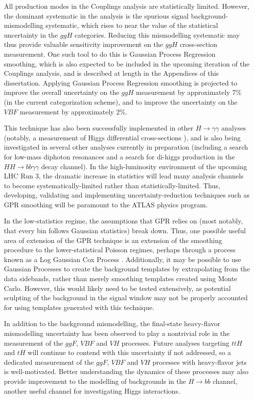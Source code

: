 All production modes in the Couplings analysis are statistically limited. However, the dominant systematic in the analysis is the spurious signal background-mismodelling systematic, which rises to near the value of the statistical uncertainty in the $ggH$ categories. Reducing this mismodelling systematic may thus provide valuable sensitivity improvement on the $ggH$ cross-section measurement. One such tool to do this is Gaussian Process Regression smoothing, which is also expected to be included in the upcoming iteration of the Couplings analysis, and is described at length in the Appendices of this dissertation. Applying Gaussian Process Regression smoothing is projected to improve the overall uncertainty on the $ggH$ measurement by approximately 7\% (in the current categorization scheme), and to improve the uncertainty on the $VBF$ measurement by approximately 2\%. 

This technique has also been successfully implemented in other $H \rightarrow \gamma \gamma$ analyses (notably, a measurement of Higgs differential cross-sections \cite{XSecs}), and is also being investigated in several other analyses currently in preparation (including a search for low-mass diphoton resonances and a search for di-higgs production in the $HH \rightarrow bb \gamma \gamma$ decay channel). In the high-luminosity environment of the upcoming LHC Run 3, the dramatic increase in statistics will lead many analysis channels to become systematically-limited rather than statistically-limited. Thus, developing, validating and implementing uncertainty-reduction techniques such as GPR smoothing will be paramount to the ATLAS physics program.

In the low-statistics regime, the assumptions that GPR relies on (most notably, that every bin follows Gaussian statistics) break down. Thus, one possible useful area of extension of the GPR technique is an extension of the smoothing procedure to the lower-statistical Poisson regimes, perhaps through a process known as a Log Gaussian Cox Process \cite{LogCox}. Additionally, it may be possible to use Gaussian Processes to create the background templates by extrapolating from the data sidebands, rather than merely smoothing templates created using Monte Carlo. However, this would likely need to be tested extensively, as potential sculpting of the background in the signal window may not be properly accounted for using templates generated with this technique.

In addition to the background mismodelling, the final-state heavy-flavor mismodelling uncertainty has been observed to play a nontrivial role in the measurement of the $ggF$, $VBF$ and $VH$ processes. Future analyses targeting $ttH$ and $tH$ will continue to contend with this uncertainty if not addressed, so a dedicated measurement of the $ggF$, $VBF$ and $VH$ processes with heavy-flavor jets is well-motivated. Better understanding the dynamics of these processes may also provide improvement to the modelling of backgrounds in the $H \rightarrow bb$ channel, another useful channel for investigating Higgs interactions.

